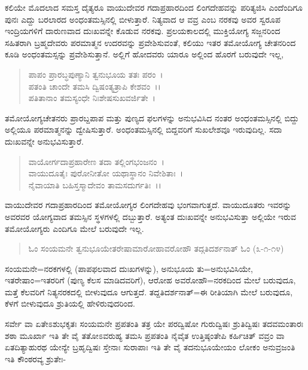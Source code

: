 ಕಲಿಯೇ ಮೊದಲಾದ ಸಮಸ್ತ ದೈತ್ಯರೂ ವಾಯುದೇವರ ಗದಾಪ್ರಹಾರದಿಂದ ಲಿಂಗದೇಹವನ್ನು ಪರಿತ್ಯಜಿಸಿ ಎಂದೆಂದಿಗೂ ಪುನಃ ಎದ್ದು ಬರಲಾರದ ಅಂಧಂತಮಸ್ಸಿನಲ್ಲಿ ಬೀಳುತ್ತಾರೆ. ನಿತ್ಯವಾದ ಆ ವವ್ರ ಎಂಬ ನರಕವು ಅವರ ಸ್ವರೂಪ ಇಂದ್ರಿಯಗಳಿಗೆ ದಾರುಣವಾದ ದುಃಖವನ್ನೇ ಕೊಡುವ ನರಕವು. ಪ್ರಲಯಕಾಲದಲ್ಲಿ ಮುಕ್ತಿಯೋಗ್ಯ ಸಜ್ಜನರಿಂದ ಸಹಿತರಾಗಿ ಬ್ರಹ್ಮದೇವರು ಪರಮಾತ್ಮನ ಉದರವನ್ನು ಪ್ರವೇಶಿಸುವಂತೆ, ಕಲಿಯು ಇತರ ತಮೋಯೋಗ್ಯ ಚೇತನರಿಂದ ಕೂಡಿ ಅಂಧಂತಮಸ್ಸನ್ನು ಪ್ರವೇಶಿಸುತ್ತಾನೆ. ಅಲ್ಲಿಗೆ ಹೋದವರು ಯಾರೂ ಅಲ್ಲಿಂದ ಹೊರಗೆ ಬರುವುದೇ ಇಲ್ಲ,

\begin{verse}
ಪಾಪಂ ಪ್ರಾರಬ್ಧಪುಣ್ಯಾನಿ ತ್ವನುಭೂಯ ತತಃ ಪರಂ~।\\ ಪತಂತಿ ಚಾಂದೇ ತಮಸಿ ದ್ವಿಷಂತ್ಯತ್ರಾಪಿ ಕೇಶವಂ~।।\\ ಪತಿತಾನಾಂ ತಮಸ್ಯಂಧೇ ನಿಃಶೇಷಸುಖವರ್ಜಿತೇ~।
\end{verse}


ತಮೋಯೋಗ್ಯಚೇತನರು ಪ್ರಾರಬ್ದಪಾಪ ಮತ್ತು ಪುಣ್ಯದ ಫಲಗಳನ್ನು ಅನುಭವಿಸಿದ ನಂತರ ಅಂಧಂತಮಸ್ಸಿನಲ್ಲಿ ಬಿದ್ದು ಅಲ್ಲಿಯೂ ಪರಮಾತ್ಮನನ್ನು ದ್ವೇಷಿಸುತ್ತಾರೆ. ಅಂಧಂತಮಸ್ಸಿನಲ್ಲಿ ಬಿದ್ದವರಿಗೆ ಸುಖಲೇಶವೂ ಇರುವುದಿಲ್ಲ. ಸದಾ ದುಃಖವನ್ನೇ ಅನುಭವಿಸುತ್ತಾರೆ.

\begin{verse}
ವಾಯೋರ್ಗದಾಪ್ರಹಾರೇಣ ತದಾ ತಲ್ಲಿಂಗಭಂಜನಂ~।\\ ವಾಯುದೂತೈಃ ಪುರೋನೀತೋ ಯಥಾಸ್ಥಾನಂ ನಿವೇಶಿತಾಃ~।\\ ನೈವಾಯಾತಿ ಬಹಿಸ್ತಸ್ಮಾದೇವಂ ತಾಮಸದುರ್ಗತಿಃ~।।
\end{verse}


ವಾಯುದೇವರ ಗದಾಪ್ರಹಾರದಿಂದ ತಮೋಯೋಗ್ಯರ ಲಿಂಗದೇಹವು ಭಂಗವಾಗುತ್ತದೆ. ವಾಯುದೂತರು ಇವರನ್ನು ಅವರವರ ಯೋಗ್ಯವಾದ ತಮಸ್ಸಿನ ಸ್ಥಳಗಳಲ್ಲಿ ದಬ್ಬುತ್ತಾರೆ. ಅತ್ಯಂತ ದುಃಖವನ್ನೇ ಅನುಭವಿಸುತ್ತಾ ಅಲ್ಲಿಯೇ ಇರುವ ತಮೋಯೋಗ್ಯರು ಎಂದಿಗೂ ಮೇಲೆ ಬರುವುದೇ ಇಲ್ಲ.

\begin{verse}
ಓಂ ಸಂಯಮನೇ ತ್ವನುಭೂಯೇತರೇಷಾಮಾರೋಹಾವರೋಹೌ ತದ್ಗತಿದರ್ಶನಾತ್ ಓಂ (೩-೧-೧೪)
\end{verse}

ಸಂಯಮನೇ=ನರಕಗಳಲ್ಲಿ (ಪಾಪಫಲವಾದ ದುಃಖಗಳನ್ನು), ಅನುಭೂಯ ತು=ಅನುಭವಿಸಿಯೇ, ಇತರೇಷಾಂ=ಇತರರಿಗೆ (ಪುಣ್ಯ ಕೆಲಸ ಮಾಡಿದವರಿಗೆ), ಆರೋಹ ಅವರೋಹೌ=ನರಕದಿಂದ ಮೇಲೆ ಬರುವುದೂ, ಮತ್ತೆ ಕೆಲವರಿಗೆ ನಿತ್ಯನರಕದಲ್ಲಿ ಬೀಳುವುದೂ ಆಗುತ್ತದೆ. ತದ್ದತಿದರ್ಶನಾತ್=ಈ ರೀತಿಯಾಗಿ ಮೇಲೆ ಬರುವುದೂ, ಕೆಳಗೆ ಬೀಳುವುದೂ ಶ್ರುತಿಯಲ್ಲಿ ಹೇಳಿರುವುದರಿಂದ.

ಸರ್ವೇ ವಾ ಏತೇಽಶುಭಕೃತಃ ಸಂಯಮನೇ ಪ್ರಪತಂತಿ ತತ್ರ ಯೇ ಪರದ್ವಿಷೋ ಗುರುದ್ವಿಷಃ ಶ್ರುತಿದ್ವಿಷಃ ತದವಮಂತಾರಃ ಶಠಾ ಮೂರ್ಖಾ ಇತಿ ತೇ ವೈ ತತೋಽವರುಹ್ಯ ತಮಸಿ ಪ್ರಪತಂತಿ ನೈವೈತ ಉತ್ತಿಷ್ಠಂತೇಪಿ ಕರ್ಹಿಚಿತ್ ವವ್ರಂ ವಾ ಏತದಿತ್ಯಾಹುರಥ ಯೇನ್ಯೇ ಬ್ರಹೃದ್ವಿಷಃ ಸ್ತೇನಾಃ ಸುರಾಪಾಃ ಇತಿ ತೇ ವೈ ತದನುಭೂಯೇಯಂ ಲೋಕಂ ಅನುವ್ರಜಂತಿ ಇತಿ ಕೌಂಠರವ್ಯ ಶ್ರುತೇಃ-

